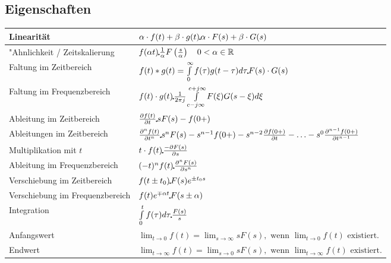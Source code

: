  	\subsection{Eigenschaften}
  		\renewcommand{\arraystretch}{2}
		\begin{tabular}{|p{6cm}|p{11cm}|}
        	\hline
        	Linearität & 
 			$\alpha\cdot f(t) + \beta\cdot g(t) \laplace \alpha\cdot F(s) + \beta\cdot
 			G(s)$ \\
 			\hline
 			"Ahnlichkeit / Zeitskalierung &
 			$f(\alpha t) \laplace \frac{1}{\alpha}F \left (\frac{s}{\alpha} \right ) \quad 0
 			<\alpha \in\mathbb{R}$ \\
 			\hline
 			Faltung im Zeitbereich &
 			$f(t) \ast g(t) = \int\limits_{0}^{\infty} f(\tau)g(t-\tau)d\tau \laplace F(s)
 			\cdot G(s)$\\
 			\hline
 			Faltung im Frequenzbereich &
 			$f(t) \cdot g(t) \laplace \frac{1}{2\pi j}\int\limits_{c-j\infty}^{c+j\infty}
 			F(\xi) G(s-\xi)d\xi$ \\
 			\hline
 			Ableitung im Zeitbereich &
 			$\frac{\partial f(t)}{\partial t} \laplace sF(s)
 			-f(0+)$ \\
 			\hline
 			Ableitungen im Zeitbereich &
 			$\frac{\partial^n f(t)}{\partial t^n} \laplace s^nF(s)
 			-s^{n-1}f(0+)-s^{n-2}\frac{\partial f(0+)}{\partial t}-\ldots
 			-s^0\frac{\partial^{n-1} f(0+)}{\partial t^{n-1}}$ \\
 			\hline
 			Multiplikation mit $t$ &
 			$t\cdot f(t)  \laplace \frac{-\partial F(s)}{\partial s}$ \\
 			\hline
 			Ableitung im Frequenzbereich &
 			$(-t)^n f(t) \laplace  \frac{\partial^n F(s)}{\partial s^n}$ \\
 			\hline
 			Verschiebung im Zeitbereich &
 			$f(t\pm t_0) \laplace F(s)e^{\pm t_0 s}$ \\
 			\hline
 			Verschiebung im Frequenzbereich &
 			$f(t)e^{\mp\alpha t} \laplace F(s\pm\alpha)$ \\
 			\hline
 			Integration &
 			$\int\limits_0^t f(\tau)d\tau \laplace \frac{F(s)}{s}$ \\
 			\hline
 			Anfangswert &
 			$\lim_{t\rightarrow 0} f(t) = \lim_{s\rightarrow \infty} sF(s),\text{~wenn
 			}  \lim_{t\rightarrow 0} f(t)\text{~existiert}.$ \\
 			\hline
 			Endwert &
 			$\lim_{t\rightarrow \infty} f(t) = \lim_{s\rightarrow 0} sF(s),\text{~wenn
 			}  \lim_{t\rightarrow \infty} f(t)\text{~existiert}.$ \\
 			\hline
       	\end{tabular}
		\renewcommand{\arraystretch}{1}
		
